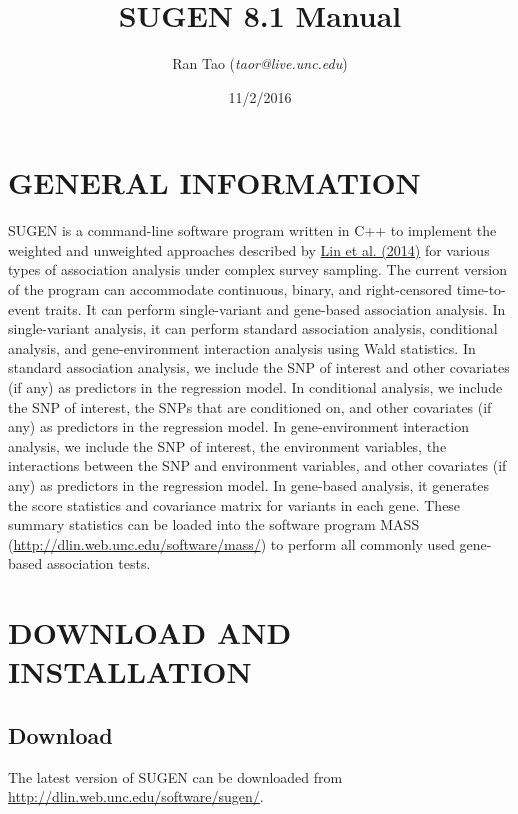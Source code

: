 \documentclass[12pt,letter]{article}
\title{\bf{SUGEN 8.1 Manual}}
\author{Ran Tao ({\it taor@live.unc.edu})}
\date{11/2/2016}
\begin{document}

\maketitle

\newpage
\tableofcontents

\newpage
\section{GENERAL INFORMATION}

SUGEN is a command-line software program written in C++ to implement the weighted and 
unweighted approaches 
described by \href{http://www.cell.com/ajhg/abstract/S0002-9297(14)00471-6}{Lin et al. (2014)} for various types of association analysis under 
complex survey sampling. 
The current version of the program can accommodate continuous, binary,
and right-censored time-to-event traits. It can perform
single-variant and gene-based association analysis. In single-variant analysis, 
it can perform standard association analysis, conditional analysis, and
gene-environment interaction analysis using Wald statistics. 
In standard association analysis, we include the SNP of interest and other covariates (if any)
as predictors in the regression model. In conditional analysis, we include the SNP of interest, 
the SNPs that are conditioned on, and other covariates (if any) as predictors in the regression model.
In gene-environment interaction analysis, we include the SNP of interest, the environment variables,
the interactions between the SNP and environment variables, and other covariates (if any)
as predictors in the regression model. In gene-based analysis, it generates the
score statistics and covariance
matrix for variants in each gene. These summary statistics can be loaded into the software program 
MASS (\url{http://dlin.web.unc.edu/software/mass/})
to perform all commonly used gene-based association tests.

\section{DOWNLOAD AND INSTALLATION}

\subsection{Download}
The latest version of SUGEN can be downloaded from \url{http://dlin.web.unc.edu/software/sugen/}.
\end{document}
